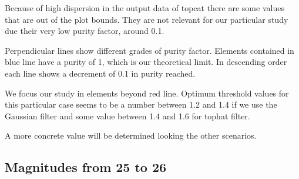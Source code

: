 \documentclass{article}
\begin{document}
Because of high dispersion in the output data of topcat there are some values that are out of the plot bounds. They are not relevant for our particular study due their very low purity factor, around 0.1.
\par
Perpendicular lines show different grades of purity factor. Elements contained in blue line have a purity of 1, which is our theoretical limit. In descending order each line shows a decrement of 0.1 in purity reached.
\par
We focus our study in elements beyond red line.
Optimum threshold values for this particular case seems to be a number between 1.2 and 1.4 if we use the Gaussian filter and some value between 1.4 and 1.6 for tophat filter.
\par
A more concrete value will be determined looking the other scenarios.

%
%
\subsection{Magnitudes from 25 to 26}
\end{document}
